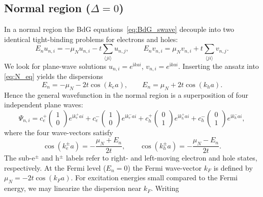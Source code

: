 \documentclass[11pt,a4paper,twoside,openany]{report}
\begin{document}
\subsection{Normal region ($\Delta = 0$)}
\label{sec:gen_sol_normal}
In a normal region the BdG equations~\eqref{eq:BdG_swave} decouple into two identical tight-binding problems for electrons and holes:
\begin{equation}
  E_n u_{n,i} = -\mu_N u_{n,i} - t\sum_{\langle ji\rangle} u_{n,j}, \qquad
  E_n v_{n,i} = \mu_N v_{n,i} + t\sum_{\langle ji\rangle} v_{n,j}.
  \label{eq:N_eq}
\end{equation}
We look for plane-wave solutions $u_{n,i} = e^{\mathrm{i} k a i}$, $v_{n,i} = e^{\mathrm{i} k a i}$.
Inserting the ansatz into \eqref{eq:N_eq} yields the dispersions
\begin{equation}
  E_n = -\mu_N - 2t\cos(k_e a), \qquad
  E_n = \mu_N + 2t\cos(k_h a).
  \label{eq:disp_N}
\end{equation}
Hence the general wavefunction in the normal region is a superposition of four independent plane waves:
\begin{equation}
  \Psi_{n,i} = c_e^+\begin{pmatrix} 1 \\ 0 \end{pmatrix} e^{\mathrm{i} k_e^+ a i}
              + c_e^-\begin{pmatrix} 1 \\ 0 \end{pmatrix} e^{\mathrm{i} k_e^- a i}
              + c_h^+\begin{pmatrix} 0 \\ 1 \end{pmatrix} e^{\mathrm{i} k_h^+ a i}
              + c_h^-\begin{pmatrix} 0 \\ 1 \end{pmatrix} e^{\mathrm{i} k_h^- a i},
  \label{eq:Psi_N_general}
\end{equation}
where the four wave-vectors satisfy
\begin{equation}
  \cos(k_e^\pm a) = -\frac{\mu_N + E_n}{2t}, \qquad
  \cos(k_h^\pm a) = -\frac{\mu_N - E_n}{2t}.
  \label{eq:cos_N}
\end{equation}
The sub-e$^\pm$ and h$^\pm$ labels refer to right- and left-moving electron and hole states, respectively.  At the Fermi level ($E_n=0$) the Fermi wave-vector $k_F$ is defined by $\mu_N = -2t\cos(k_F a)$.  For excitation energies small compared to the Fermi energy, we may linearize the dispersion near $k_F$.  Writing
\end{document}

